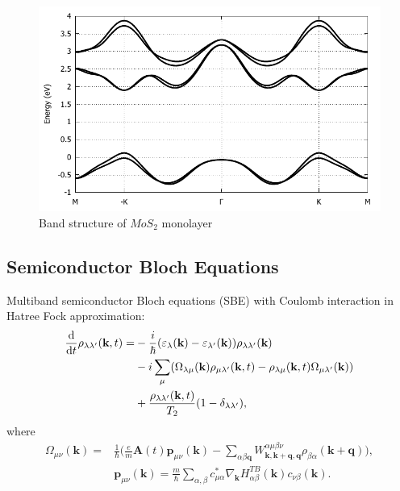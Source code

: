 \documentclass{beamer}
\begin{document}
	\begin{frame}
		\begin{figure}
			\caption{Band structure of $MoS_2$ monolayer
	\autocite{liu_three-band_2013}}	
			\includegraphics[width=0.75\linewidth]{images/BS.pdf}
		\end{figure}
	\end{frame}
	\subsection{Semiconductor Bloch Equations}
	\begin{frame}
	Multiband semiconductor Bloch equations (SBE) with Coulomb interaction in Hatree Fock approximation:
	\begin{align}
		\dv{ }{t}\rho_{\lambda \lambda'} (\textbf{k},t) = &-\frac{i}{\hbar} (\varepsilon_{\lambda}(\textbf{k}) -\varepsilon_{\lambda'}(\textbf{k}))\rho_{\lambda \lambda'} (\textbf{k})\nonumber\\
		& -i \sum_{\mu} (\Omega_{\lambda \mu}(\textbf{k})\rho_{\mu \lambda'}(\textbf{k},t) -\rho_{\lambda \mu}(\textbf{k},t)\Omega_{\mu \lambda'}(\textbf{k}))\\
		& + \frac{\rho_{\lambda \lambda'}(\textbf{k},t)}{T_2}(1-\delta_{\lambda\lambda'}),\nonumber
	\end{align}
	where
	\begin{align}
		\Omega_{\mu \nu}(\textbf{k}) = &\frac{1}{\hbar} \bigg(\frac{e}{m}\textbf{A}(t)\textbf{p}_{\mu \nu}(\textbf{k}) - \sum_{\alpha \beta \textbf{q}} W^{\alpha \mu \beta\nu}_{\textbf{k},\textbf{k}+\textbf{q},\textbf{q}}\rho_{\beta\alpha}(\textbf{k}+\textbf{q})\bigg),\\
		&\textbf{p}_{\mu\nu}(\textbf{k}) = \frac{m}{\hbar}\sum_{\alpha,\beta} c^*_{\mu\alpha}\nabla_{\textbf{k}}H^{TB}_{\alpha\beta}(\textbf{k})c_{\nu\beta}(\textbf{k}).
	\end{align}
	\end{frame}
\end{document}
